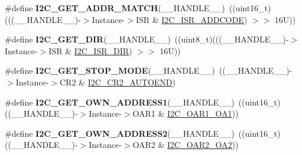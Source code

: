 \begin{DoxyCompactItemize}
\item 
\mbox{\label{group___i2_c___private___macro_ga30d76b55c39e04efb077f47eb454261d}} 
\#define {\bfseries I2\+C\+\_\+\+G\+E\+T\+\_\+\+A\+D\+D\+R\+\_\+\+M\+A\+T\+CH}(\+\_\+\+\_\+\+H\+A\+N\+D\+L\+E\+\_\+\+\_\+)~((uint16\+\_\+t)(((\+\_\+\+\_\+\+H\+A\+N\+D\+L\+E\+\_\+\+\_\+)-\/$>$Instance-\/$>$I\+SR \& \mbox{\hyperlink{group___peripheral___registers___bits___definition_ga9050a7e2c1d8777251352f51197e4c80}{I2\+C\+\_\+\+I\+S\+R\+\_\+\+A\+D\+D\+C\+O\+DE}}) $>$$>$ 16\+U))
\item 
\mbox{\label{group___i2_c___private___macro_ga0359d435a6d984b3fefdc2da709e5764}} 
\#define {\bfseries I2\+C\+\_\+\+G\+E\+T\+\_\+\+D\+IR}(\+\_\+\+\_\+\+H\+A\+N\+D\+L\+E\+\_\+\+\_\+)~((uint8\+\_\+t)(((\+\_\+\+\_\+\+H\+A\+N\+D\+L\+E\+\_\+\+\_\+)-\/$>$Instance-\/$>$I\+SR \& \mbox{\hyperlink{group___peripheral___registers___bits___definition_gaa4890d7deb94106f946b28a7309e22aa}{I2\+C\+\_\+\+I\+S\+R\+\_\+\+D\+IR}}) $>$$>$ 16\+U))
\item 
\mbox{\label{group___i2_c___private___macro_ga1bc559a860da12ee5a7517548facbc57}} 
\#define {\bfseries I2\+C\+\_\+\+G\+E\+T\+\_\+\+S\+T\+O\+P\+\_\+\+M\+O\+DE}(\+\_\+\+\_\+\+H\+A\+N\+D\+L\+E\+\_\+\+\_\+)~((\+\_\+\+\_\+\+H\+A\+N\+D\+L\+E\+\_\+\+\_\+)-\/$>$Instance-\/$>$C\+R2 \& \mbox{\hyperlink{group___peripheral___registers___bits___definition_gabcf789c74e217ec8967bcabc156a6c54}{I2\+C\+\_\+\+C\+R2\+\_\+\+A\+U\+T\+O\+E\+ND}})
\item 
\mbox{\label{group___i2_c___private___macro_gaa80106d084f4027f8f341f2c3c49dcfa}} 
\#define {\bfseries I2\+C\+\_\+\+G\+E\+T\+\_\+\+O\+W\+N\+\_\+\+A\+D\+D\+R\+E\+S\+S1}(\+\_\+\+\_\+\+H\+A\+N\+D\+L\+E\+\_\+\+\_\+)~((uint16\+\_\+t)((\+\_\+\+\_\+\+H\+A\+N\+D\+L\+E\+\_\+\+\_\+)-\/$>$Instance-\/$>$O\+A\+R1 \& \mbox{\hyperlink{group___peripheral___registers___bits___definition_gabb954a9a0e3e3898574643b6d725a70f}{I2\+C\+\_\+\+O\+A\+R1\+\_\+\+O\+A1}}))
\item 
\mbox{\label{group___i2_c___private___macro_gad0b113e974debf6a9af783e1fe08ef23}} 
\#define {\bfseries I2\+C\+\_\+\+G\+E\+T\+\_\+\+O\+W\+N\+\_\+\+A\+D\+D\+R\+E\+S\+S2}(\+\_\+\+\_\+\+H\+A\+N\+D\+L\+E\+\_\+\+\_\+)~((uint16\+\_\+t)((\+\_\+\+\_\+\+H\+A\+N\+D\+L\+E\+\_\+\+\_\+)-\/$>$Instance-\/$>$O\+A\+R2 \& \mbox{\hyperlink{group___peripheral___registers___bits___definition_ga4627c5a89a3cbe9546321418f8cb9da2}{I2\+C\+\_\+\+O\+A\+R2\+\_\+\+O\+A2}}))

\end{DoxyCompactItemize}
